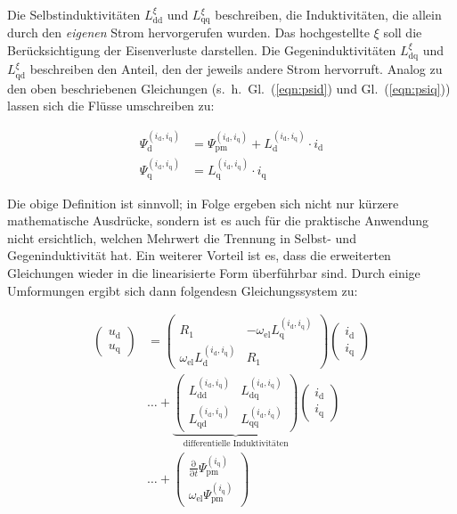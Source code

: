 \documentclass[conference,twocolumn]{IEEEtran}
\newcommand{\x}[1]{\mathrm{#1}}
\begin{document}
Die Selbstinduktivitäten $L_\x{dd}^{\xi}$ und $L_\x{qq}^{\xi}$ beschreiben, die Induktivitäten, die allein durch den \emph{eigenen} Strom hervorgerufen wurden.
Das hochgestellte $\xi$ soll die Berücksichtigung der Eisenverluste darstellen.
Die Gegeninduktivitäten $L_\x{dq}^{\xi}$ und $L_\x{qd}^{\xi}$ beschreiben den Anteil, den der jeweils andere Strom hervorruft.
Analog zu den oben beschriebenen Gleichungen (s.~h.~Gl.~(\ref{eqn:psid}) und Gl.~(\ref{eqn:psiq})) lassen sich die Flüsse umschreiben zu:

\begin{align}
\Psi_\x{d}^{(i_\x{d},i_\x{q})} &= \Psi_\x{pm}^{(i_\x{d},i_\x{q})} + L_\x{d}^{(i_\x{d},i_\x{q})}\cdot i_\x{d} \\
\Psi_\x{q}^{(i_\x{d},i_\x{q})} &= L_\x{q}^{(i_\x{d},i_\x{q})}\cdot i_\x{q}
\end{align}

Die obige Definition ist sinnvoll; in Folge ergeben sich nicht nur kürzere mathematische Ausdrücke, sondern ist es auch für die praktische Anwendung nicht ersichtlich, welchen Mehrwert die Trennung in Selbst- und Gegeninduktivität hat.
Ein weiterer Vorteil ist es, dass die erweiterten Gleichungen wieder in die linearisierte Form überführbar sind.
Durch einige Umformungen ergibt sich \textcite{Kellner2012} dann folgendesn Gleichungssystem zu:

\begin{align}
\left( \begin{array}{c} u_\x{d} \\ u_\x{q} \end{array} \right) &= \left( \begin{array}{cc} R_\x{1} & -\omega_\x{el}L_\x{q}^{(i_\x{d},i_\x{q})} \\ \omega_\x{el}L_\x{d}^{(i_\x{d},i_\x{q})} & R_\x{1} \end{array} \right) \left(\begin{array}{c} i_\x{d} \\ i_\x{q} \end{array}\right) \label{eqn:allg-spannungsgleichung} \\ 
 &\ldots + \underbrace{\left( \begin{array}{cc} L_\x{dd}^{(i_\x{d},i_\x{q})} & L_\x{dq}^{(i_\x{d},i_\x{q})} \\ L_\x{qd}^{(i_\x{d},i_\x{q})} & L_\x{qq}^{(i_\x{d},i_\x{q})} \end{array}\right)}_{\text{differentielle Induktivitäten}} \left(\begin{array}{c} i_\x{d} \\ i_\x{q} \end{array} \right) \nonumber \\ 
& \ldots + \left( \begin{array}{c} \frac{\x{\partial}}{\x{\partial }t} \Psi_\x{pm}^{(i_\x{q})} \\ \omega_\x{el} \Psi_\x{pm}^{(i_\x{q})} \nonumber \end{array}  \right) \nonumber
\end{align}
\end{document}
